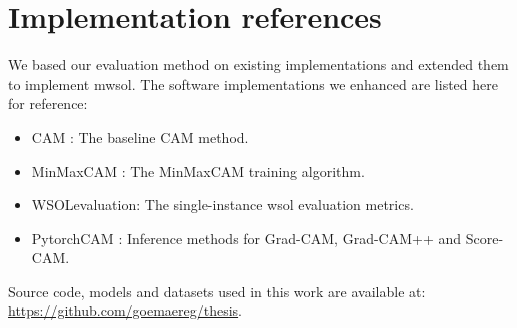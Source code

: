 \section{Implementation references}
We based our evaluation method on existing implementations and extended them to implement \acrlong{mwsol}. The software implementations we enhanced are listed here for reference:
\begin{itemize}
    \item CAM \cite{code:CAM}: The baseline CAM method.
    \item MinMaxCAM \cite{code:MinMaxCAM}: The MinMaxCAM training algorithm.
    \item WSOLevaluation\cite{code:WSOLevaluation}: The single-instance \acrshort{wsol} evaluation metrics.
    \item PytorchCAM \cite{code:PytorchCAM}: Inference methods for Grad-CAM, Grad-CAM++ and Score-CAM.
\end{itemize}

Source code, models and datasets used in this work are available at:\\ \url{https://github.com/goemaereg/thesis}.